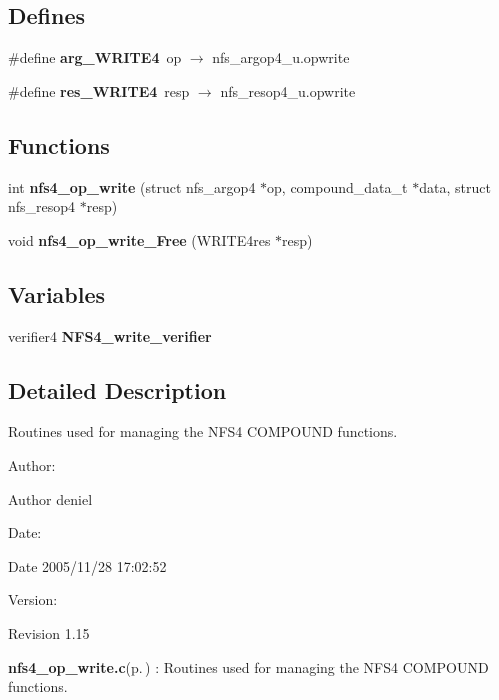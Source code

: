 \subsection*{Defines}
\begin{CompactItemize}
\item 
\#define {\bf arg\_\-WRITE4}\ op $\rightarrow$ nfs\_\-argop4\_\-u.opwrite
\item 
\#define {\bf res\_\-WRITE4}\ resp $\rightarrow$ nfs\_\-resop4\_\-u.opwrite
\end{CompactItemize}
\subsection*{Functions}
\begin{CompactItemize}
\item 
int {\bf nfs4\_\-op\_\-write} (struct nfs\_\-argop4 $\ast$op, compound\_\-data\_\-t $\ast$data, struct nfs\_\-resop4 $\ast$resp)
\item 
void {\bf nfs4\_\-op\_\-write\_\-Free} (WRITE4res $\ast$resp)
\end{CompactItemize}
\subsection*{Variables}
\begin{CompactItemize}
\item 
verifier4 {\bf NFS4\_\-write\_\-verifier}
\end{CompactItemize}


\subsection{Detailed Description}
Routines used for managing the NFS4 COMPOUND functions. 

\begin{Desc}
\item[Author:]\begin{Desc}
\item[Author]deniel \end{Desc}
\end{Desc}
\begin{Desc}
\item[Date:]\begin{Desc}
\item[Date]2005/11/28 17:02:52 \end{Desc}
\end{Desc}
\begin{Desc}
\item[Version:]\begin{Desc}
\item[Revision]1.15 \end{Desc}
\end{Desc}
{\bf nfs4\_\-op\_\-write.c}{\rm (p.\,\pageref{nfs4__op__write_8c})} : Routines used for managing the NFS4 COMPOUND functions.

